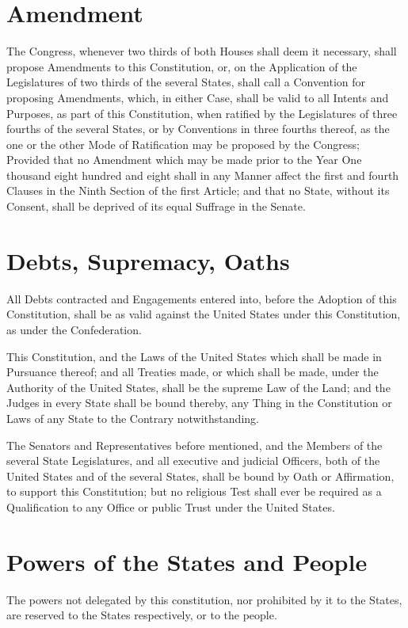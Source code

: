 \documentclass{constitution}
\begin{document}
\chapter{Amendment}
The Congress, whenever two thirds of both Houses shall deem it necessary,
shall propose Amendments to this Constitution,
or, on the Application of the Legislatures of two thirds of the several States,
shall call a Convention for proposing Amendments,
which, in either Case, shall be valid to all Intents and Purposes, as part of this Constitution,
when ratified by the Legislatures of three fourths of the several States,
or by Conventions in three fourths thereof,
as the one or the other Mode of Ratification may be proposed by the Congress;
Provided that no Amendment which may be made
prior to the Year One thousand eight hundred and eight
shall in any Manner affect the first and fourth Clauses in the Ninth Section of the first Article;
and that no State, without its Consent, shall be deprived of its equal Suffrage in the Senate.

\chapter{Debts, Supremacy, Oaths}
All Debts contracted and Engagements entered into, before the Adoption of this Constitution,
shall be as valid against the United States under this Constitution, as under the Confederation.

This Constitution, and the Laws of the United States which shall be made in Pursuance thereof;
and all Treaties made, or which shall be made, under the Authority of the United States,
shall be the supreme Law of the Land;
and the Judges in every State shall be bound thereby,
any Thing in the Constitution or Laws of any State to the Contrary notwithstanding.

The Senators and Representatives before mentioned,
and the Members of the several State Legislatures,
and all executive and judicial Officers, both of the United States and of the several States,
shall be bound by Oath or Affirmation, to support this Constitution;
but no religious Test shall ever be required as a Qualification to any Office or public Trust under the United States.

\chapter{Powers of the States and People}
The powers not delegated by this constitution,
nor prohibited by it to the States,
are reserved to the States respectively,
or to the people.
\end{document}

